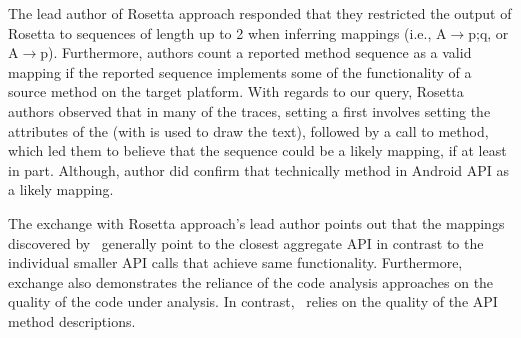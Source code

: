 The lead author of Rosetta approach responded that they restricted the output of
Rosetta to sequences of length up to 2 when inferring mappings (i.e., {A$\rightarrow$p;q}, or {A$\rightarrow$p}). Furthermore, authors count a reported method sequence as a valid mapping
if the reported sequence implements some of the functionality of a source method on the target platform.
With regards to our query, Rosetta authors observed that in many of the traces, setting a  first involves setting the attributes of the  (with is used to draw the text), followed by a call to  method, which led them to believe that the sequence    could be a likely mapping, if at least in part.
Although, author did confirm that technically  method in Android API as a likely mapping.

The exchange with Rosetta approach's lead author points out that
the mappings discovered by \tool\ generally point to
the closest aggregate API in contrast to the individual smaller API calls
that achieve same functionality.
Furthermore, exchange also demonstrates the reliance of the
code analysis approaches on the quality of the code under analysis.
In contrast, \tool\ relies on the quality of the API method descriptions.


